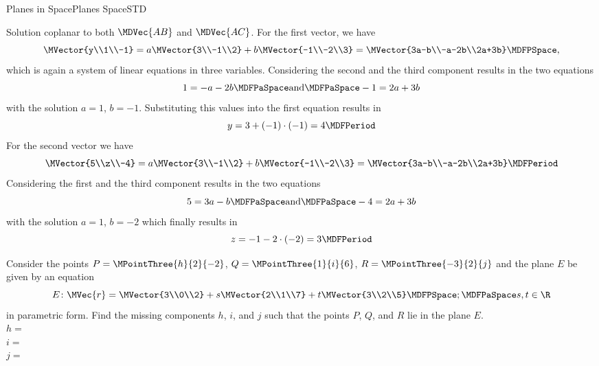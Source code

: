 \begin{MXContent}{Planes in Space}{Planes Space}{STD}
\begin{MExercise}
\begin{MHint}{Solution}
coplanar to both $\MDVec{A B}$ and $\MDVec{A C}$. For the first vector, we have
\[
 \MVector{y\\1\\-1}=a\MVector{3\\-1\\2}+b\MVector{-1\\-2\\3}=\MVector{3a-b\\-a-2b\\2a+3b} \MDFPSpace,
\]
which is again a system of linear equations in three variables. Considering the second and the third 
component results in the two equations
\[
 1=-a-2b\MDFPaSpace\textrm{and}\MDFPaSpace -1=2a+3b 
\]
with the solution $a=1$, $b=-1$. Substituting this values into the first equation results in 
\[
 y= 3+ (-1)\cdot(-1)=4 \MDFPeriod
\]
For the second vector we have
\[
 \MVector{5\\z\\-4}=a\MVector{3\\-1\\2}+b\MVector{-1\\-2\\3}=\MVector{3a-b\\-a-2b\\2a+3b}\MDFPeriod
\]
Considering the first and the third component results in the two equations
\[
 5=3a-b\MDFPaSpace\textrm{and}\MDFPaSpace -4=2a+3b
\]
with the solution $a=1$, $b=-2$ which finally results in
\[
 z=-1-2\cdot(-2)=3\MDFPeriod
\]
\end{MHint}

\end{MExercise}


\begin{MExercise}
Consider the points $P=\MPointThree{h}{2}{-2}$, $Q=\MPointThree{1}{i}{6}$, $R=\MPointThree{-3}{2}{j}$ and the plane $E$ be given by an equation 
\[
 E\colon\MVec{r}=\MVector{3\\0\\2}+s\MVector{2\\1\\7}+t\MVector{3\\2\\5}\MDFPSpace;\MDFPaSpace s,t\in\R
\]
in parametric form. Find the missing components $h$, $i$, and $j$ such that the points $P$, $Q$, and $R$ lie in 
the plane $E$.\\
$h=$\\
$i=$\\
$j=$\\


\end{MExercise}
\end{MXContent}
